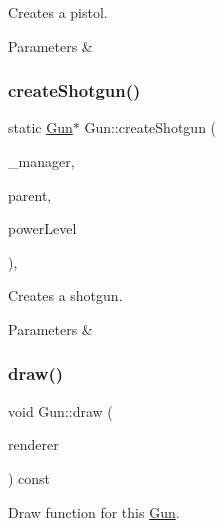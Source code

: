 Creates a pistol. 


\begin{DoxyParams}{Parameters}
{\em } & \\
\hline
\end{DoxyParams}
\mbox{\label{class_gun_a75188b702cff75b55d03c565be7a386e}} 
\subsubsection{\texorpdfstring{createShotgun()}{createShotgun()}}
{\footnotesize\ttfamily static \mbox{\hyperlink{class_gun}{Gun}}$\ast$ Gun\+::create\+Shotgun (\begin{DoxyParamCaption}\item[{\mbox{\hyperlink{class_game_manager}{Game\+Manager}} $\ast$}]{\+\_\+manager,  }\item[{\mbox{\hyperlink{class_game_entity}{Game\+Entity}} $\ast$}]{parent,  }\item[{float}]{power\+Level }\end{DoxyParamCaption})\hspace{0.3cm}{\ttfamily [inline]}, {\ttfamily [static]}}



Creates a shotgun. 


\begin{DoxyParams}{Parameters}
{\em } & \\
\hline
\end{DoxyParams}
\mbox{\label{class_gun_a7944c121dad08710e89c4b118c790b11}} 
\subsubsection{\texorpdfstring{draw()}{draw()}}
{\footnotesize\ttfamily void Gun\+::draw (\begin{DoxyParamCaption}\item[{\mbox{\hyperlink{classsf_1_1_render_target}{sf\+::\+Render\+Target}} \&}]{renderer }\end{DoxyParamCaption}) const\hspace{0.3cm}{\ttfamily [virtual]}}



Draw function for this \mbox{\hyperlink{class_gun}{Gun}}. 


